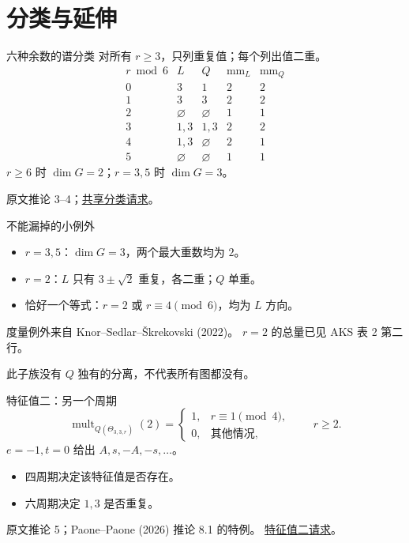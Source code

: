 \documentclass{beamer}
\begin{document}
\section{分类与延伸}
\begin{frame}{六种余数的谱分类}
\small 对所有 $r\geq3$，只列重复值；每个列出值二重。
\[
\begin{array}{c|cc|cc}
r\bmod6&L&Q&\operatorname{mm}_L&\operatorname{mm}_Q\\\hline
0&3&1&2&2\\1&3&3&2&2\\2&\varnothing&\varnothing&1&1\\
3&1,3&1,3&2&2\\4&1,3&\varnothing&2&1\\5&\varnothing&\varnothing&1&1
\end{array}
\]
$r\geq6$ 时 $\dim G=2$；$r=3,5$ 时 $\dim G=3$。

\small 原文推论 3--4；\href{https://github.com/the-omega-institute/trureturing-requests/issues/40}{共享分类请求}。
\end{frame}
\begin{frame}{不能漏掉的小例外}
\begin{itemize}
\item $r=3,5$：$\dim G=3$，两个最大重数均为 $2$。
\item $r=2$：$L$ 只有 $3\pm\sqrt2$ 重复，各二重；$Q$ 单重。
\item 恰好一个等式：$r=2$ 或 $r\equiv4\pmod6$，均为 $L$ 方向。
\end{itemize}
\small 度量例外来自 Knor--Sedlar--Škrekovski (2022)。
$r=2$ 的总量已见 AKS 表 2 第二行。

此子族没有 $Q$ 独有的分离，不代表所有图都没有。
\end{frame}
\begin{frame}{特征值二：另一个周期}
\[
\operatorname{mult}_{Q(\Theta_{3,3,r})}(2)=
\begin{cases}1,&r\equiv1\pmod4,\\0,&\text{其他情况},\end{cases}
\qquad r\geq2.
\]
$e=-1,t=0$ 给出 $A,s,-A,-s,\ldots$。

\begin{itemize}
\item 四周期决定该特征值是否存在。
\item 六周期决定 $1,3$ 是否重复。
\end{itemize}
\small 原文推论 5；Paone--Paone (2026) 推论 8.1 的特例。
\href{https://github.com/the-omega-institute/trureturing-requests/issues/41}{特征值二请求}。
\end{frame}
\end{document}
